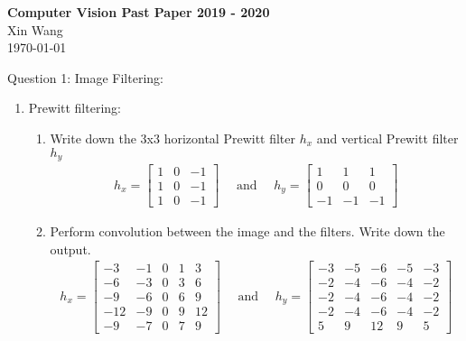 \documentclass{article}
\newcommand{\maketitletwo}[2][]{\begin{center}
        \Large{\textbf{Computer Vision Past Paper #1 \\ } }
        \vspace{5pt}
        \normalsize{Xin Wang \\ 
        \today}   
        \vspace{15pt}
\end{center}}
\begin{document}
    \maketitletwo[2019 - 2020] 

    \textbf{Question 1: Image Filtering}:
    \begin{enumerate}[label=\alph*)]
        \item  Prewitt filtering:
        \begin{enumerate}[label=(\roman*)]
            \item Write down the 3x3 horizontal Prewitt filter $h_x$ and vertical Prewitt filter $h_y$
            \begin{gather*}
                h_x = \begin{bmatrix}
                    1&0&-1 \\
                    1&0&-1 \\
                    1&0&-1 
                \end{bmatrix} \quad \text{ and } \quad 
                h_y = \begin{bmatrix}
                    1&1&1 \\
                    0&0&0 \\
                    -1&-1&-1 
                \end{bmatrix}
            \end{gather*}
            
            \item Perform convolution between the image and the filters. Write down the output.
            \begin{gather*}
                h_x = \begin{bmatrix}
                    -3 & -1 & 0 & 1 & 3 \\ 
                    -6 & -3 & 0 & 3 & 6 \\
                    -9 & -6 & 0 & 6 & 9 \\ 
                    -12 & -9 & 0 & 9 & 12 \\
                    -9 & -7 & 0 & 7 & 9
                \end{bmatrix} \quad \text{ and } \quad  
                h_y = \begin{bmatrix}
                    -3 & -5 & -6 & -5 & -3 \\
                    -2 & -4 & -6 & -4 & -2 \\
                    -2 & -4 & -6 & -4 & -2 \\ 
                    -2 & -4 & -6 & -4 & -2 \\
                    5 & 9 & 12 & 9 & 5
                \end{bmatrix}
            \end{gather*}


\end{enumerate}
\end{enumerate}
\end{document}
